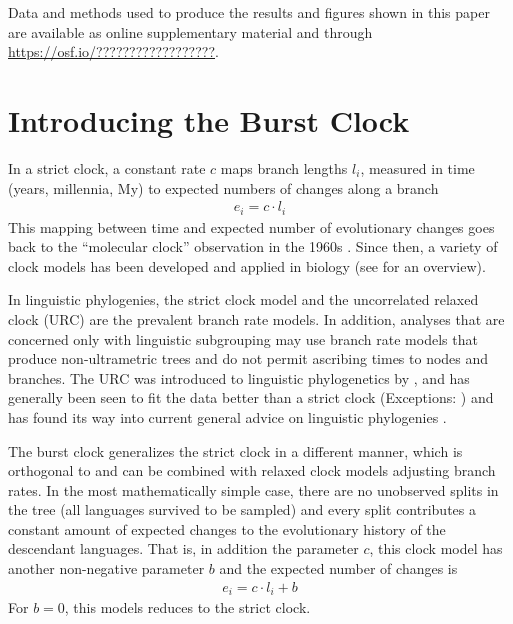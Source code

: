 \documentclass[a4paper,12pt]{scrartcl}
\begin{document}
Data and methods used to produce the results and figures shown in this paper are
available as online supplementary material and through
\url{https://osf.io/??????????????????}.

\section{Introducing the Burst Clock}
\label{sec:description}
In a strict clock,
a constant rate $c$ maps branch lengths $l_i$,
measured in time (years, millennia, My) to expected numbers of changes
along a branch
\begin{align}
  e_i = c \cdot l_i
  \label{eq:strict}
\end{align}
This mapping between time and expected number of evolutionary changes goes back
to the “molecular clock” observation in the 1960s
\parencite{zuckerkandl1965evolutionary}. Since then, a variety of clock models
has been developed and applied in biology (see \textcite{ho2014molecularclock} for an
overview).

In linguistic phylogenies, the strict clock model and the uncorrelated relaxed
clock (URC) are the prevalent branch rate models. In addition, analyses that are
concerned only with linguistic subgrouping may use branch rate models that
produce non-ultrametric trees and do not permit ascribing times to nodes and
branches. The URC \parencite{drummond2006relaxed} was introduced to linguistic
phylogenetics by \textcite{kitchen2009bayesian}, and has generally been seen to
fit the data better than a strict clock
\parencite{bouckaert2012mapping,honkola2013cultural,lee2013evolution}
(Exceptions: \textcite{savelyev2020bayesian,kaiping2021systematic})
and has found its way into current general advice on linguistic phylogenies
\parencite{maurits2017beastling,hoffmann2021bayesian}.

The burst clock generalizes the strict clock in a different manner, which is
orthogonal to and can be combined with relaxed clock models adjusting branch
rates. In the most mathematically simple case, there are no unobserved splits in
the tree (all languages survived to be sampled) and every split contributes a
constant amount of expected changes to the evolutionary history of the
descendant languages. That is, in addition the parameter $c$, this clock model
has another non-negative parameter $b$ and the expected number of changes is
\begin{align}
  e_i = c \cdot l_i + b
  \label{eq:simple-burst}
\end{align}
For $b=0$, this models reduces to the strict clock.
\end{document}
